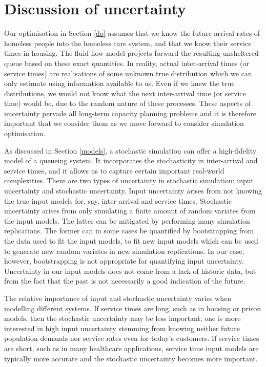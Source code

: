 \documentclass[12pt,a4paper]{article}
\begin{document}
\newpage

\section{Discussion of uncertainty} \label{uncert}

Our optimisation in Section \ref{do} assumes that we know the future arrival rates of homeless people into the homeless care system, and that we know their service times in housing. The fluid flow model projects forward the resulting unsheltered queue based on these exact quantities. In reality, actual inter-arrival times (or service times) are realisations of some unknown true distribution which we can only estimate using information available to us. Even if we knew the true distributions, we would not know what the next inter-arrival time (or service time) would be, due to the random nature of these processes. These aspects of uncertainty pervade all long-term capacity planning problems and it is therefore important that we consider them as we move forward to consider simulation optimisation.

As discussed in Section \ref{models}, a stochastic simulation can offer a high-fidelity model of a queueing system. It incorporates the stochasticity in inter-arrival and service times, and it allows us to capture certain important real-world complexities. There are two types of uncertainty in stochastic simulation: input uncertainty and stochastic uncertainty. Input uncertainty arises from not knowing the true input models for, say, inter-arrival and service times. Stochastic uncertainty arises from only simulating a finite amount of random variates from the input models. The latter can be mitigated by performing many simulation replications. The former can in some cases be quantified by bootstrapping from the data used to fit the input models, to fit new input models which can be used to generate new random variates in new simulation replications. In our case, however, bootstrapping is not appropriate for quantifying input uncertainty. Uncertainty in our input models does not come from a lack of historic data, but from the fact that the past is not necessarily a good indication of the future.

The relative importance of input and stochastic uncertainty varies when modelling different systems. If service times are long, such as in housing or prison models, then the stochastic uncertainty may be less important; one is more interested in high input uncertainty stemming from knowing neither future population demands nor service rates even for today's customers. If service times are short, such as in many healthcare applications, service time input models are typically more accurate and the stochastic uncertainty becomes more important. 
\end{document}
